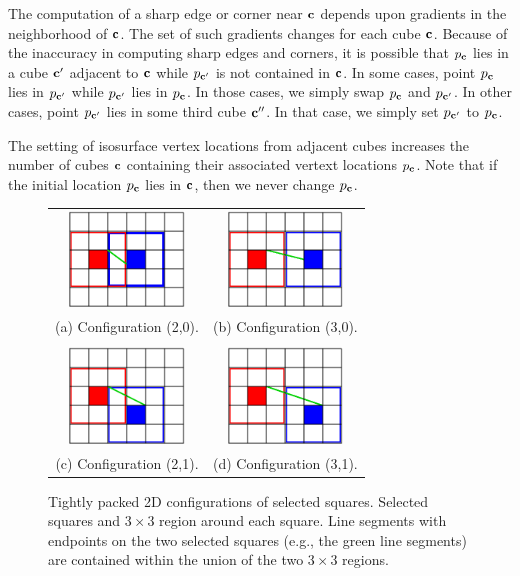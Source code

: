 The computation of a sharp edge or corner near $\mathbf{c}$ depends
upon gradients in the neighborhood of $\mathbf{c}$.
The set of such gradients changes for each cube $\mathbf{c}$.
Because of the inaccuracy in computing sharp edges and corners,
it is possible that $p_{\mathbf{c}}$ lies in a cube $\mathbf{c}'$ adjacent to $\mathbf{c}$
while $p_{\mathbf{c}'}$ is not contained in $\mathbf{c}$.
In some cases,
point $p_{\mathbf{c}}$ lies in $p_{\mathbf{c}'}$ while $p_{\mathbf{c}'}$ lies in $p_{\mathbf{c}}$.
In those cases,
we simply swap $p_{\mathbf{c}}$ and $p_{\mathbf{c}'}$.
In other cases, point $p_{\mathbf{c}'}$ lies in some third cube $\mathbf{c}''$.
In that case, we simply set $p_{\mathbf{c}'}$ to $p_{\mathbf{c}}$.

The setting of isosurface vertex locations from adjacent cubes
increases the number of cubes $\mathbf{c}$ containing 
their associated vertext locations $p_{\mathbf{c}}$.
Note that if the initial location $p_{\mathbf{c}}$ lies in $\mathbf{c}$,
then we never change $p_{\mathbf{c}}$.


\begin{figure}
\centering
\begin{tabular}{cc}
\includegraphics[width=1.2in]{images/config2D_2_0.eps} \qquad &
\qquad
\includegraphics[width=1.2in]{images/config2D_3_0.eps} \\
(a) Configuration (2,0). & (b) Configuration (3,0). \\
\\
\includegraphics[width=1.2in]{images/config2D_2_1.eps}
\qquad &
\qquad
\includegraphics[width=1.2in]{images/config2D_3_1.eps} \\
(c) Configuration (2,1). & (d) Configuration (3,1).
\end{tabular}
\caption{Tightly packed 2D configurations of selected squares.
Selected squares and $3 \times 3$ region around each square.
Line segments with endpoints on the two selected squares 
(e.g., the green line segments) are contained
within the union of the two $3 \times 3$ regions.}
\label{fig:packed2D}
\end{figure}

